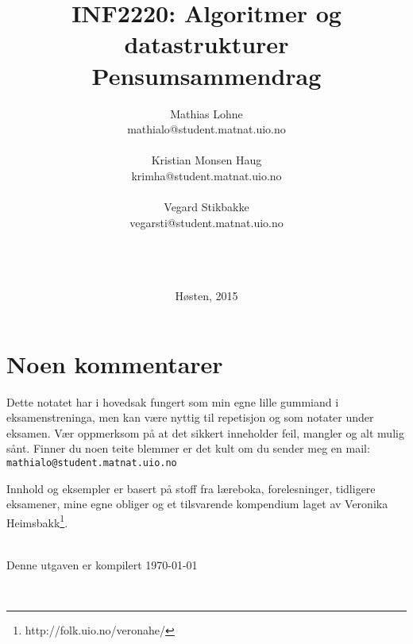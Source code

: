 \documentclass[10pt,norsk,a4paper,hidelinks]{article}
\title{\sffamily \Huge INF2220: Algoritmer og datastrukturer\\ Pensumsammendrag}
\author{\sffamily Mathias Lohne\\ \footnotesize\sffamily mathialo@student.matnat.uio.no\\~\\\sffamily Kristian Monsen Haug\\ \footnotesize\sffamily krimha@student.matnat.uio.no \\~\\ \sffamily Vegard Stikbakke \\ \footnotesize \footnotesize\sffamily vegarsti@student.matnat.uio.no}
\date{~\\~\\~\\\sffamily Høsten, 2015}
\theoremstyle{indented}
\begin{document}
\maketitle
\newpage

\section*{Noen kommentarer}
Dette notatet har i hovedsak fungert som min egne lille gummiand i eksamenstreninga, men kan være nyttig til repetisjon og som notater under eksamen. Vær oppmerksom på at det sikkert inneholder feil, mangler og alt mulig sånt. Finner du noen teite blemmer er det kult om du sender meg en mail: \verb|mathialo@student.matnat.uio.no|

Innhold og eksempler er basert på stoff fra læreboka, forelesninger, tidligere eksamener, mine egne obliger og et tilsvarende kompendium laget av Veronika Heimsbakk\footnote{http://folk.uio.no/veronahe/}.

~\\Denne utgaven er kompilert \today

~\\

\tableofcontents
\newpage

\newpage
\newpage

\newpage

\newpage

\newpage

\newpage

\newpage



\end{document}
